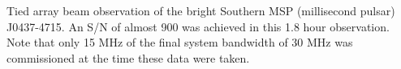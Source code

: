 
  Tied array beam observation of the bright Southern MSP (millisecond pulsar) J0437-4715. An S/N of almost 900 was achieved in this 1.8 hour observation. Note that only 15 MHz of the final system bandwidth of 30 MHz was commissioned at the time these data were taken.  
  
  